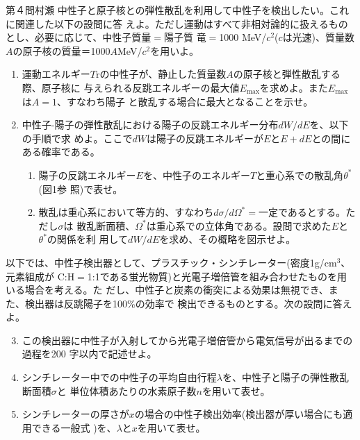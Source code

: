 \begin{question}{第４問}{村瀬}
中性子と原子核との弾性散乱を利用して中性子を検出したい。これに関連した以下の設問に答
えよ。ただし運動はすべて非相対論的に扱えるものとし、必要に応じて、中性子質量$=$陽子質
竜$=$1000 MeV/$c^2$($c$は光速)、質量数$A$の原子核の質量＝1000$A$MeV/$c^2$を用いよ。
\begin{enumerate}
\item
  運動エネルギー$T$rの中性子が、静止した質量数$A$の原子核と弾性散乱する際、原子核に
  与えられる反跳エネルギーの最大値$E_\mathrm{max}$を求めよ。また$E_\mathrm{max}$は$A=1$、すなわち陽子
  と散乱する場合に最大となることを示せ。

\item
  中性子-陽子の弾性散乱における陽子の反跳エネルギー分布$dW/dE$を、以下の手順で求
  めよ。ここで$dW$は陽子の反跳エネルギーが$E$と$E+dE$との間にある確率である。
  \begin{enumerate}
  \item{}
    陽子の反跳エネルギー$E$を、中性子のエネルギー$T$と重心系での散乱角$\theta^*$(図1参
    照)で表せ。
  \item
    散乱は重心系において等方的、すなわち$d\sigma/d\Omega^*=一定$であるとする。ただし$\sigma$は
    散乱断面積、$\Omega^*$は重心系での立体角である。設問で求めた$E$と$\theta^*$の関係を利
    用して$dW/dE$を求め、その概略を図示せよ。
  \end{enumerate}
\end{enumerate}

以下では、中性子検出器として、プラスチック・シンチレーター(密度1g/cm$^3$、元素組成が
C:H$=$1:1である蛍光物質)と光電子増倍管を組み合わせたものを用いる場合を考える。た
だし、中性子と炭素の衝突による効果は無視でき、また、検出器は反跳陽子を100\%の効率で
検出できるものとする。次の設問に答えよ。

\begin{enumerate}
\setcounter{enumi}{2}
\item
  この検出器に中性子が入射してから光電子増倍管から電気信号が出るまでの過程を200
  字以内で記述せよ。

\item
  シンチレーター中での中性子の平均自由行程$\lambda$を、中性子と陽子の弾性散乱断面積$\sigma$と
  単位体積あたりの水素原子数$n$を用いて表せ。

\item
  シンチレーターの厚さが$x$の場合の中性子検出効率(検出器が厚い場合にも適用できる一般式
  )を、$\lambda$と$x$を用いて表せ。


\end{enumerate}
\end{question}
